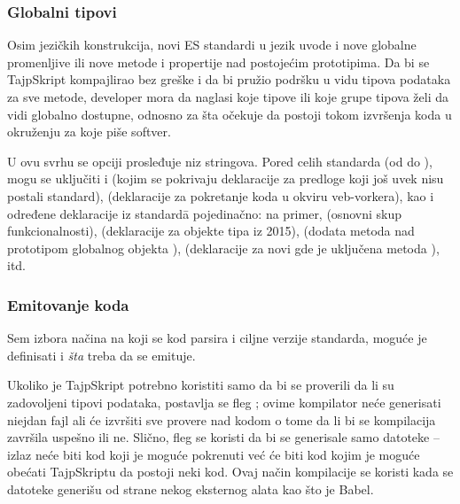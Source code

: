 \subsubsection{Globalni tipovi}

Osim jezičkih konstrukcija, novi ES standardi u jezik uvode i nove globalne promenljive ili nove metode i propertije nad postojećim prototipima.
Da bi se TajpSkript kompajlirao bez greške i da bi pružio podršku u vidu tipova podataka za sve metode, developer mora da naglasi koje tipove ili koje grupe tipova želi da vidi globalno dostupne, odnosno za šta očekuje da postoji tokom izvršenja koda u okruženju za koje piše softver.

U ovu svrhu se opciji  prosleđuje niz stringova.
Pored celih standarda (od  do ), mogu se uključiti i  (kojim se pokrivaju deklaracije za predloge koji još uvek nisu postali standard),  (deklaracije za pokretanje koda u okviru veb-vorkera), kao i određene deklaracije iz standard\=a pojedinačno: na primer,  (osnovni skup funkcionalnosti),  (deklaracije za objekte tipa  iz 2015),  (dodata metoda  nad prototipom globalnog objekta ),  (deklaracije za novi  gde je uključena metoda ), itd.

\subsubsection{Emitovanje koda}

Sem izbora načina na koji se kod parsira i ciljne verzije standarda, moguće je definisati i \textit{šta} treba da se emituje.

Ukoliko je TajpSkript potrebno koristiti samo da bi se proverili da li su zadovoljeni tipovi podataka, postavlja se fleg ; ovime kompilator neće generisati niejdan fajl ali će izvršiti sve provere nad kodom o tome da li bi se kompilacija završila uspešno ili ne.
Slično, fleg  se koristi da bi se generisale samo  datoteke -- izlaz neće biti kod koji je moguće pokrenuti već će biti kod kojim je moguće obećati TajpSkriptu da postoji neki kod.
Ovaj način kompilacije se koristi kada se  datoteke generišu od strane nekog eksternog alata kao što je Babel.

